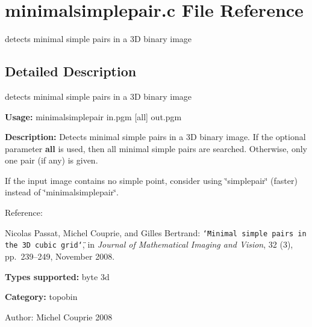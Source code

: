 \section{minimalsimplepair.c File Reference}
\label{minimalsimplepair_8c}
detects minimal simple pairs in a 3D binary image 



\subsection{Detailed Description}
detects minimal simple pairs in a 3D binary image 

{\bf Usage:} minimalsimplepair in.pgm [all] out.pgm

{\bf Description:} Detects minimal simple pairs in a 3D binary image. If the optional parameter {\bf all} is used, then all minimal simple pairs are searched. Otherwise, only one pair (if any) is given.

If the input image contains no simple point, consider using \char`\"{}simplepair\char`\"{} (faster) instead of \char`\"{}minimalsimplepair\char`\"{}.

Reference:\par
 [PCB08] Nicolas Passat, Michel Couprie, and Gilles Bertrand: {\tt \char`\"{}Minimal simple pairs in the 3D cubic grid\char`\"{}}, in {\em Journal of Mathematical Imaging and Vision\/}, 32 (3), pp.~239–249, November 2008.\par


{\bf Types supported:} byte 3d

{\bf Category:} topobin

\begin{Desc}
\item[Author:]Michel Couprie 2008 \end{Desc}
